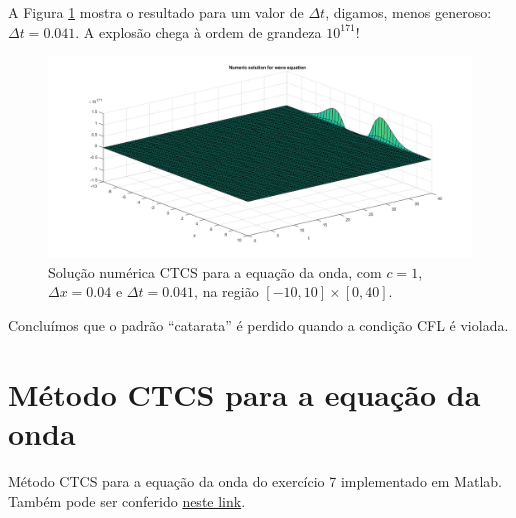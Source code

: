 \documentclass{article}
\begin{document}
\begin{enumerate}
            \clearpage

            A Figura \ref{fig:wave_5} mostra o resultado para um valor de
            $\Delta t$, digamos, menos generoso: $\Delta t = 0.041$. A explosão
            chega à ordem de grandeza $10^{171}$!

            \begin{figure}[!h]
                \centerline{
                    \includegraphics[width=1.4\textwidth]{images/wave_5.png}
                }
                \caption{Solução numérica CTCS para a equação da onda, com $c = 1$,
                $\Delta x = 0.04$ e $\Delta t = 0.041$, na região $[-10, 10] \times [0, 40]$.}
                \label{fig:wave_5}
            \end{figure}

            Concluímos que o padrão ``catarata'' é perdido quando a condição
            CFL é violada.


    \end{enumerate}

    \clearpage

    \appendix

    \section{Método CTCS para a equação da onda}
        \label{appendix:ctcs}

        Método CTCS para a equação da onda do exercício 7 implementado
        em Matlab.
        Também pode ser conferido
        \href{https://github.com/lucasresck/introduction-to-numerical-analysis/blob/master/list_5/ctcs_7.m}{neste link}.
\end{document}
